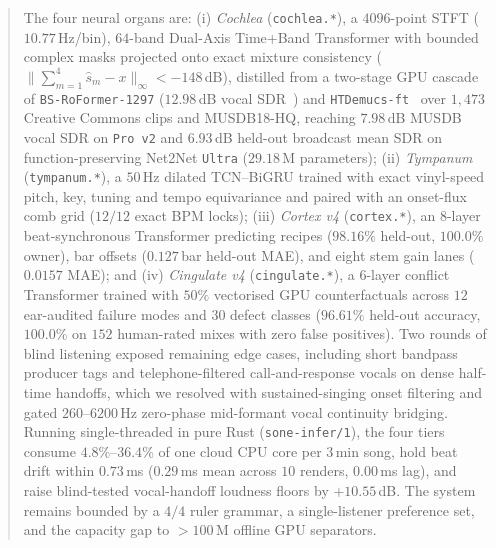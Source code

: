 \documentclass[11pt]{article}
\newcommand{\op}[1]{\texttt{#1}}
\begin{document}
\begin{abstract}
The four neural organs are: (i) \emph{Cochlea} (\op{cochlea.*}), a $4096$-point STFT ($10.77$\,Hz/bin), $64$-band Dual-Axis Time+Band Transformer with bounded complex masks projected onto exact mixture consistency ($\|\sum_{m=1}^4 \hat{s}_m - x\|_\infty < -148$\,dB), distilled from a two-stage GPU cascade of \op{BS-RoFormer-1297} ($12.98$\,dB vocal SDR~\citep{lu2024bsroformer}) and \op{HTDemucs-ft}~\citep{rouard2023hybrid} over $1{,}473$ Creative Commons clips and MUSDB18-HQ, reaching $7.98$\,dB MUSDB vocal SDR on \op{Pro v2} and $6.93$\,dB held-out broadcast mean SDR on function-preserving Net2Net \op{Ultra} ($29.18$\,M parameters); (ii) \emph{Tympanum} (\op{tympanum.*}), a $50$\,Hz dilated TCN--BiGRU trained with exact vinyl-speed pitch, key, tuning and tempo equivariance and paired with an onset-flux comb grid ($12/12$ exact BPM locks); (iii) \emph{Cortex v4} (\op{cortex.*}), an $8$-layer beat-synchronous Transformer predicting recipes ($98.16\%$ held-out, $100.0\%$ owner), bar offsets ($0.127$\,bar held-out MAE), and eight stem gain lanes ($0.0157$ MAE); and (iv) \emph{Cingulate v4} (\op{cingulate.*}), a $6$-layer conflict Transformer trained with $50\%$ vectorised GPU counterfactuals across $12$ ear-audited failure modes and $30$ defect classes ($96.61\%$ held-out accuracy, $100.0\%$ on $152$ human-rated mixes with zero false positives). Two rounds of blind listening exposed remaining edge cases, including short bandpass producer tags and telephone-filtered call-and-response vocals on dense half-time handoffs, which we resolved with sustained-singing onset filtering and gated $260$--$6200$\,Hz zero-phase mid-formant vocal continuity bridging. Running single-threaded in pure Rust (\op{sone-infer/1}), the four tiers consume $4.8\%$--$36.4\%$ of one cloud CPU core per $3$\,min song, hold beat drift within $0.73$\,ms ($0.29$\,ms mean across $10$ renders, $0.00$\,ms lag), and raise blind-tested vocal-handoff loudness floors by $+10.55$\,dB. The system remains bounded by a $4/4$ ruler grammar, a single-listener preference set, and the capacity gap to $>100$\,M offline GPU separators.
\end{abstract}












\clearpage
\appendix

\end{document}
